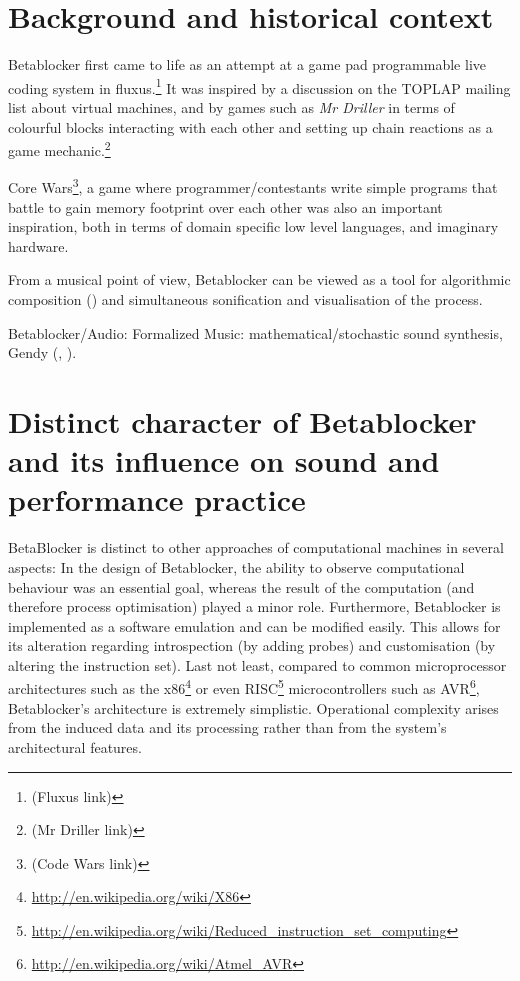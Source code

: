 \documentclass[letterpaper, 12pt]{article}
\begin{document}
\section{Background and historical context} 
\label{sec:background}


Betablocker first came to life as an attempt at a game pad programmable live coding system in fluxus.\footnote{
(Fluxus link)
} 
It was inspired by a discussion on the TOPLAP mailing list about virtual machines, and by games such as \emph{Mr Driller} in terms of colourful blocks interacting with each other and setting up chain reactions as a game mechanic.\footnote{
(Mr Driller link)
}
 
Core Wars\footnote{
(Code Wars link)
}, a game where programmer/contestants write simple programs that battle to gain memory footprint over each other was also an important inspiration, both in terms of domain specific low level languages, and imaginary hardware.

From a musical point of view, Betablocker can be viewed as a tool for algorithmic composition (\cite{maurer1999-a-b}) and simultaneous sonification and visualisation of the process.

Betablocker/Audio: Formalized Music: mathematical/stochastic sound synthesis, Gendy (\cite{Xenakis:1971}, \cite{luque2009-the}).



\section{Distinct character of Betablocker and its influence on sound and performance practice} 
\label{sec:distinct_character}


BetaBlocker is distinct to other approaches of computational machines in several aspects:
In the design of Betablocker, the ability to observe computational behaviour was an essential goal, whereas the result of the computation (and therefore process optimisation) played a minor role.  
Furthermore, Betablocker is implemented as a software emulation and can be modified easily.
This allows for its alteration regarding introspection (by adding probes) and customisation (by altering the instruction set).
Last not least, compared to common microprocessor architectures such as the x86\footnote{\url{http://en.wikipedia.org/wiki/X86}} or even RISC\footnote{\url{http://en.wikipedia.org/wiki/Reduced_instruction_set_computing}} microcontrollers such as AVR\footnote{\url{http://en.wikipedia.org/wiki/Atmel_AVR}}, Betablocker's architecture is extremely simplistic.
Operational complexity arises from the induced data and its processing rather than from the system's architectural features.
\end{document}

